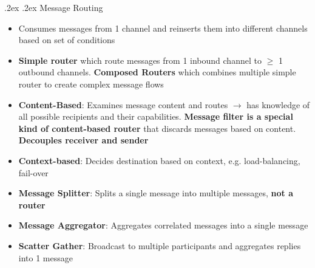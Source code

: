 \documentclass[10pt,landscape,a4paper]{article}
\makeatletter
\renewcommand{\subsubsection}{\@startsection{subsubsection}{1}{0mm}%
	{.2ex}%
	{.2ex}%
	{\rmfamily\bfseries}}
\makeatother
\begin{document}
\begin{multicols*}{4}
		\subsubsection{Message Routing}
		\begin{itemize}
			\item Consumes messages from 1 channel and reinserts them into different channels based on set of conditions
			\item \textbf{Simple router} which route messages from 1 inbound channel to $\geq$ 1 outbound channels. \textbf{Composed Routers} which combines multiple simple router to create complex message flows
			\item \textbf{Content-Based}: Examines message content and
			routes $\rightarrow$ has knowledge of all possible recipients and their capabilities. \textbf{Message filter is a special kind of content-based router} that discards messages based on content. \textbf{Decouples receiver and sender}
			\item \textbf{Context-based}: Decides destination based on context,
			e.g. load-balancing, fail-over
			\item \textbf{Message Splitter}: Splits a single message into multiple messages, \textbf{not a router}
			\item \textbf{Message Aggregator}: Aggregates correlated messages
			into a single message
			\item \textbf{Scatter Gather}: Broadcast to multiple participants
			and aggregates replies into 1 message
		\end{itemize}

\end{multicols*}
\end{document}
